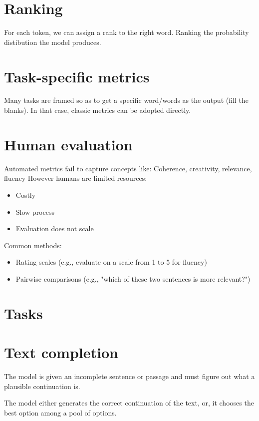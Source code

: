 \section{Ranking}

For each token, we can assign a rank to the right word. Ranking the probability distibution the model produces.

\section{Task-specific metrics}

Many tasks are framed so as to get a specific word/words as the
output (fill the blanks).
In that case, classic metrics can be adopted directly.

\section{Human evaluation}

Automated metrics fail to capture concepts like: Coherence, creativity, relevance, fluency
However humans are limited resources:
\begin{itemize}
  \item Costly
  \item Slow process
  \item Evaluation does not scale
\end{itemize}

Common methods:

\begin{itemize}
  \item  Rating scales (e.g., evaluate on a scale from 1 to 5 for fluency)
  \item Pairwise comparisons (e.g., "which of these two sentences is more relevant?")
\end{itemize}

\section{Tasks}

\section{Text completion}
The model is given an incomplete sentence or passage and must
figure out what a plausible continuation is.

The model either generates the correct continuation of the text, or, it chooses the best option among a pool of options.

